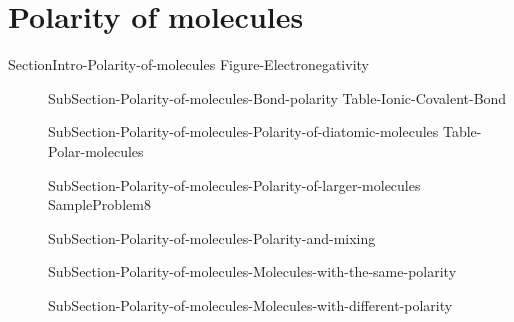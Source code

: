 \documentclass[main.tex]{subfiles}
\begin{document}
{\section{Polarity of molecules}{SectionIntro-Polarity-of-molecules}
{Figure-Electronegativity}	
\sloppy \begin{description}
\item[] {SubSection-Polarity-of-molecules-Bond-polarity}
{Table-Ionic-Covalent-Bond}
\item[] {SubSection-Polarity-of-molecules-Polarity-of-diatomic-molecules}
{Table-Polar-molecules}
\item[] {SubSection-Polarity-of-molecules-Polarity-of-larger-molecules}
{SampleProblem8}
\item[] {SubSection-Polarity-of-molecules-Polarity-and-mixing}
\item[] {SubSection-Polarity-of-molecules-Molecules-with-the-same-polarity}
\item[] {SubSection-Polarity-of-molecules-Molecules-with-different-polarity}
\end{description}


\renewcommand\chapterlabel{Ch-Solids}


}
\end{document}
